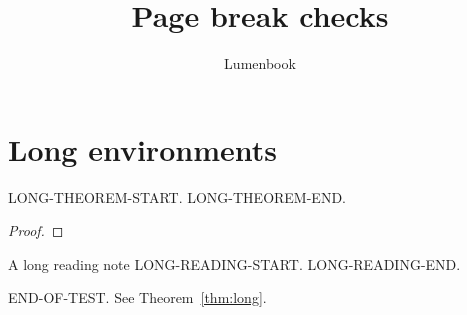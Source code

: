 \documentclass[print]{lumenbook}
\title{Page break checks}
\author{Lumenbook}
\begin{document}
\chapter{Long environments}
\begin{theorem}\label{thm:long}
LONG-THEOREM-START.
\lipsum[1-6]
LONG-THEOREM-END.
\end{theorem}
\begin{proof}
\lipsum[7]
\end{proof}
\begin{readingbox}{A long reading note}
LONG-READING-START.
\lipsum[8-13]
LONG-READING-END.
\end{readingbox}
END-OF-TEST. See Theorem~\ref{thm:long}.
\end{document}
